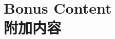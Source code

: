 \documentclass[10pt,a4paper]{book}
\begin{document}
\part[Bonus Content]{\texorpdfstring{Bonus Content \\[4pt] \normalsize 附加内容}{Bonus Content --- 附加内容}}


\appendix
\end{document}
